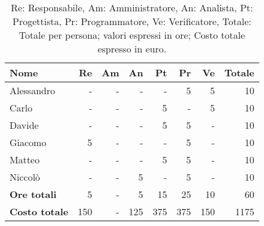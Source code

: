 \begin{table}[H]
	\centering
	\begin{tabular}{l|r|r|r|r|r|r|r}
		\textbf{Nome}         & \textbf{Re} & \textbf{Am} & \textbf{An} & \textbf{Pt} & \textbf{Pr} & \textbf{Ve} & \textbf{Totale} \\
		\hline
		Alessandro            & -           & -           & -           & -           & 5           & 5           & 10              \\
		Carlo                 & -           & -           & -           & 5           & -           & 5           & 10              \\
		Davide                & -           & -           & -           & 5           & 5           & -           & 10              \\
		Giacomo               & 5           & -           & -           & -           & 5           & -           & 10              \\
		Matteo                & -           & -           & -           & 5           & 5           & -           & 10              \\
		Niccolò               & -           & -           & 5           & -           & 5           & -           & 10              \\
		\hline
		\textbf{Ore totali}   & 5           & -           & 5           & 15          & 25          & 10          & 60              \\
		\textbf{Costo totale} & 150         & -           & 125         & 375         & 375         & 150         & 1175
	\end{tabular}
	\caption{Re: Responsabile, Am: Amministratore, An: Analista, Pt: Progettista,
		Pr: Programmatore, Ve: Verificatore, Totale: Totale per persona; valori espressi in ore; Costo totale espresso in euro.}
\end{table}

